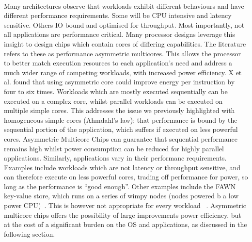 \paragraph{} Many architectures observe that workloads exhibit different behaviours and have different performance requirements. Some will be CPU intensive and latency sensitive. Others IO bound and optimised for throughput. Most importantly, not all applications are performance critical. Many processor designs
leverage this insight to design chips which contain cores of differing 
capabilities. The literature refers to these as performance asymmetric multicores. This allows the processor to better match execution resources to each 
application's need and address a much wider range of competing workloads, 
with increased power efficiency. X et al. found that using asymmetric core could improve energy per instruction by four to six times. Workloads which are mostly executed sequentially can be executed on a complex core, whilst parallel workloads can be executed on multiple simple cores. This addresses the issue we previously highlighted with homogeneous simple cores (Ahmdahl's law); that performance is bound by the sequential portion of the application, which suffers if executed on less powerful cores. Asymmetric Multicore Chips can guarantee that sequential performance remains high whilst power consumption can be reduced for highly parallel applications. Similarly, applications vary in their performanc requirements. Examples include workloads which are not latency or throughput sensitive, and can therefore execute on less powerful cores, trading off performance for power, so long as the performance is ``good enough''. Other examples include the FAWN key-value store, which runs on a series of wimpy nodes (nodes powered b a low power CPU)~\cite{andersen2009fawn}. This is however not appropriate for every workload ~\cite{lang2010nonwimpy}.
Asymmetric multicore chips offers the possibility of large improvements power efficiency, but at the cost of a significant burden on the OS and applications,
as discussed in the following section. 

